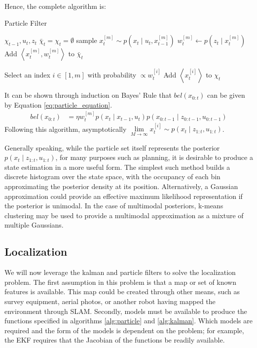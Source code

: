 \documentclass[english]{article}
\begin{document}
Hence, the complete algorithm is:
\begin{algorithm}
\caption{Particle Filter}
\label{alg:particle}
\begin{algorithmic}
	\REQUIRE $\chi_{t-1}, u_t, z_t$
        \STATE $\bar{\chi}_t = \chi_t = \emptyset$
        \STATE sample $x^{[m]}_t \sim p(x_t \mid u_t,x^{[m]}_{t-1})$
        \STATE $w^{[m]}_t \leftarrow p(z_t \mid x^{[m]}_t)$
        \STATE Add $\left\langle x^{[m]}_t, w^{[m]}_t \right\rangle$ to $\bar{\chi}_t$
        \ENDFOR

        \STATE Select an index $i \in [1,m]$ with probability $\propto w^{[i]}_t$
        \STATE Add $\left\langle x^{[i]}_t \right\rangle$ to $\chi_t$
        \ENDFOR

\end{algorithmic}
\end{algorithm}

It can be shown through induction on Bayes' Rule that $bel(x_{0:t})$ can be given by Equation \ref{eq:particle_equation}.
\begin{align}
  bel(x_{0:t}) & = \eta w^{[m]}_tp(x_t \mid x_{t-1}, u_t)p(x_{0:t-1} \mid z_{0:t-1},u_{0:t-1}) \label{eq:particle_equation}
\end{align}
Following this algorithm, asymptotically $\underset{M \to \infty}{\lim} x^{[i]}_t \sim p(x_t \mid z_{1:t}, u_{1:t})$.

Generally speaking, while the particle set itself represents the posterior $p(x_t \mid z_{1:t}, u_{1:t})$, for many purposes such as planning, it is desirable to produce a state estimation in a more useful form. The simplest such method builds a discrete histogram over the state space, with the occupancy of each bin approximating the posterior density at its position. Alternatively, a Gaussian approximation could provide an effective maximum likelihood representation if the posterior is unimodal. In the case of multimodal posteriors, k-means clustering may be used to provide a multimodal approximation as a mixture of multiple Gaussians\cite{probrob}.
\subsection{Localization}
We will now leverage the kalman and particle filters to solve the localization problem. The first assumption in this problem is that a map or set of known features is available. This map could be created through other means, such as survey equipment, aerial photos, or another robot having mapped the environment through SLAM. Secondly, models must be available to produce the functions specified in algorithms \ref{alg:particle} and \ref{alg:kalman}. Which models are required and the form of the models is dependent on the problem; for example, the EKF requires that the Jacobian of the functions be readily available.
\end{document}
